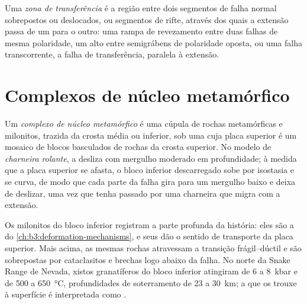 \begin{definition}\label{def:b3:extension-strike-slip:transfer}
Uma \emph{zona de transferência} é a região entre dois
segmentos de falha normal sobrepostos ou deslocados, ou segmentos de rifte, através dos quais
a extensão passa de um para o outro: uma rampa de revezamento entre duas falhas
de mesma polaridade, um alto entre semigrábens de polaridade oposta, ou uma
falha transcorrente, a falha de transferência, paralela à extensão.
\end{definition}

\section{Complexos de núcleo metamórfico}\label{sec:b3:extension-strike-slip:core}

\begin{definition}\label{def:b3:extension-strike-slip:core-complex}
Um \emph{complexo de núcleo metamórfico} é uma cúpula de
rochas metamórficas e milonitos, trazida da crosta média ou inferior,
sob uma  cuja placa superior é um mosaico de blocos basculados de
rochas da crosta superior. No modelo de \emph{charneira rolante},
a  desliza com mergulho moderado em profundidade; à medida que a placa superior se afasta,
o bloco inferior descarregado sobe por isostasia e se curva, de modo que cada parte da
falha gira para um mergulho baixo e deixa de deslizar, uma vez que tenha passado por
uma charneira que migra com a extensão.
\end{definition}

Os milonitos do bloco inferior registram a parte profunda da história: eles são
a  do \cref{ch:b3:deformation-mechanisms}, e seus 
dão o sentido de transporte da placa superior. Mais acima, as
mesmas rochas atravessam a transição frágil--dúctil e são sobrepostas por
cataclasitos e brechas logo abaixo da falha. No norte da Snake Range
de Nevada, xistos granatíferos do bloco inferior atingiram de 6 a \qty{8}{kbar}
e de 500 a \qty{650}{\celsius}, profundidades de soterramento de 23 a \qty{30}{km}; a
 que os trouxe à superfície é interpretada como .

